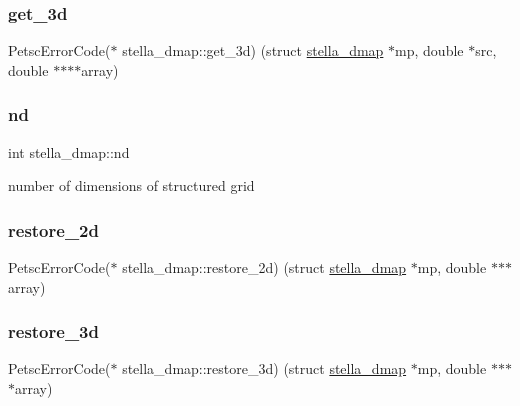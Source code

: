 \subsubsection{\texorpdfstring{get\+\_\+3d}{get\_3d}}
{\footnotesize\ttfamily Petsc\+Error\+Code($\ast$ stella\+\_\+dmap\+::get\+\_\+3d) (struct \mbox{\hyperlink{structstella__dmap}{stella\+\_\+dmap}} $\ast$mp, double $\ast$src, double $\ast$$\ast$$\ast$$\ast$array)}

\mbox{\label{structstella__dmap_a70743458c3c20e0bc910126f429ef45b}} 
\subsubsection{\texorpdfstring{nd}{nd}}
{\footnotesize\ttfamily int stella\+\_\+dmap\+::nd}



number of dimensions of structured grid 

\mbox{\label{structstella__dmap_ada758dbdff7819b7c7d6e89ee84bcde2}} 
\subsubsection{\texorpdfstring{restore\+\_\+2d}{restore\_2d}}
{\footnotesize\ttfamily Petsc\+Error\+Code($\ast$ stella\+\_\+dmap\+::restore\+\_\+2d) (struct \mbox{\hyperlink{structstella__dmap}{stella\+\_\+dmap}} $\ast$mp, double $\ast$$\ast$$\ast$array)}

\mbox{\label{structstella__dmap_a6cfc7c2d169e5b575b4e0f999304f092}} 
\subsubsection{\texorpdfstring{restore\+\_\+3d}{restore\_3d}}
{\footnotesize\ttfamily Petsc\+Error\+Code($\ast$ stella\+\_\+dmap\+::restore\+\_\+3d) (struct \mbox{\hyperlink{structstella__dmap}{stella\+\_\+dmap}} $\ast$mp, double $\ast$$\ast$$\ast$$\ast$array)}

